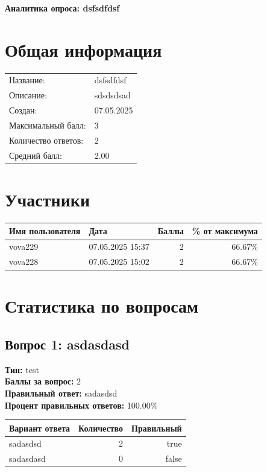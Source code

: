 \documentclass[a4paper,12pt]{article}
\begin{document}
\begin{center}
    \textbf{\Large Аналитика опроса: dsfsdfdsf}
\end{center}
\vspace{0.5cm}

\section*{Общая информация}
\begin{tabular}{ll}
    \toprule
    Название: & dsfsdfdsf \\
    Описание: & sdsdsdsad \\
    Создан: & 07.05.2025 \\
    Максимальный балл: & 3 \\
    Количество ответов: & 2 \\
    Средний балл: & 2.00 \\
    \bottomrule
\end{tabular}

\section*{Участники}
\begin{longtable}{llrr}
    \toprule
    Имя пользователя & Дата & Баллы & \% от максимума \\
    \midrule
    vova229 & 07.05.2025 15:37 & 2 & 66.67\% \\
    vova228 & 07.05.2025 15:02 & 2 & 66.67\% \\
    \bottomrule
\end{longtable}

\section*{Статистика по вопросам}

\subsection*{Вопрос 1: asdasdasd}
\textbf{Тип:} test \\
\textbf{Баллы за вопрос:} 2 \\
\textbf{Правильный ответ:} sadasdsd \\
\textbf{Процент правильных ответов:} 100.00\% \\

\begin{tabular}{lrr}
    \toprule
    Вариант ответа & Количество & Правильный \\
    \midrule
    sadasdsd & 2 & true \\
    sadasdasd & 0 & false \\
    \bottomrule
\end{tabular}
\end{document}
